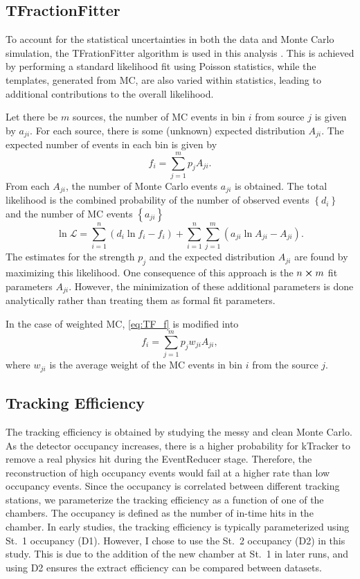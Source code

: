 \documentclass[../main.tex]{subfiles}
\begin{document}
\subsection{TFractionFitter}
To account for the statistical uncertainties in both the data and Monte Carlo
simulation, the TFrationFitter algorithm is used in this analysis \cite{barlow1993}.
This is achieved by performing a standard likelihood fit using Poisson statistics,
while the templates, generated from MC, are also varied within statistics, leading
to additional contributions to the overall likelihood.

Let there be $m$ sources, the number of MC events in bin $i$ from source $j$
is given by $a_{ji}$. For each source, there is some (unknown) expected distribution
$A_{ji}$. The expected number of events in each bin is given by
\begin{equation}
	f_i = \sum^m_{j=1} p_j A_{ji}.
	\label{eq:TF_f}
\end{equation}
From each $A_{ji}$, the number of Monte Carlo events $a_{ji}$ is obtained.
The total likelihood is the combined probability of the number of observed events $\left\{d_i\right\}$
and the number of MC events $\left\{a_{ji}\right\}$
\begin{equation}
	\ln \mathcal{L} = \sum^n_{i=1} \left(d_i \ln f_i -f_i\right) + \sum^n_{i=1} \sum^m_{j=1} \left(a_{ji} \ln A_{ji} - A_{ji}\right).
	\label{eq:TF_likelihood}
\end{equation}
The estimates for the strength $p_j$ and the expected distribution $A_{ji}$ are
found by maximizing this likelihood. One consequence of this approach is the
$n \cross m$ fit parameters $A_{ji}$. However, the  minimization of these additional
parameters is done analytically rather than treating them as formal fit parameters.

In the case of weighted MC, \cref{eq:TF_f} is modified into
\begin{equation}
	f_i = \sum^m_{j=1} p_j w_{ji}A_{ji},
\end{equation}
where $w_{ji}$ is the average weight of the MC events in bin $i$ from the source $j$.

\subsection{Tracking Efficiency}
The tracking efficiency is obtained by studying the messy and clean Monte Carlo.
As the detector occupancy increases, there is a higher probability for kTracker to
remove a real physics hit during the EventReducer stage. Therefore, the reconstruction of high occupancy
events would fail at a higher rate than low occupancy events. Since the occupancy
is correlated between different tracking stations, we parameterize the tracking efficiency
as a function of one of the chambers. The occupancy is defined as the number of
in-time hits in the chamber. In early studies, the tracking efficiency is
typically parameterized using St.~1 occupancy (D1).
However, I chose to use the St.~2 occupancy (D2) in this study. This
is due to the addition of the new chamber at St.~1 in later runs, and using D2 ensures the
extract efficiency can be compared between datasets.
\end{document}
